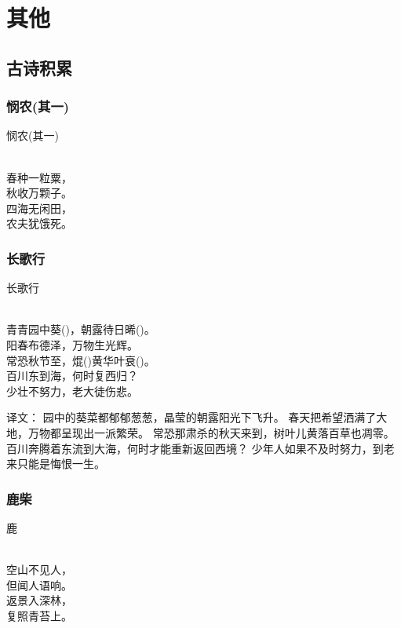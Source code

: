 \chapter{其他}
\section{古诗积累}

\subsection{悯农(其一)}

\noindent 悯农(其一)

  \\

\noindent 春种一粒粟，\\秋收万颗子。\\
四海无闲田，\\农夫犹饿死。



\subsection{长歌行}

\noindent 长歌行

  \\

\noindent 青青园中葵()，朝露待日晞()。\\
阳春布德泽，万物生光辉。\\
常恐秋节至，焜()黄华叶衰()。\\
百川东到海，何时复西归？\\
少壮不努力，老大徒伤悲。

译文：
园中的葵菜都郁郁葱葱，晶莹的朝露阳光下飞升。
春天把希望洒满了大地，万物都呈现出一派繁荣。
常恐那肃杀的秋天来到，树叶儿黄落百草也凋零。
百川奔腾着东流到大海，何时才能重新返回西境？
少年人如果不及时努力，到老来只能是悔恨一生。

\subsection{鹿柴}

\noindent 鹿

  \\

\noindent 空山不见人，\\但闻人语响。\\
返景入深林，\\复照青苔上。

